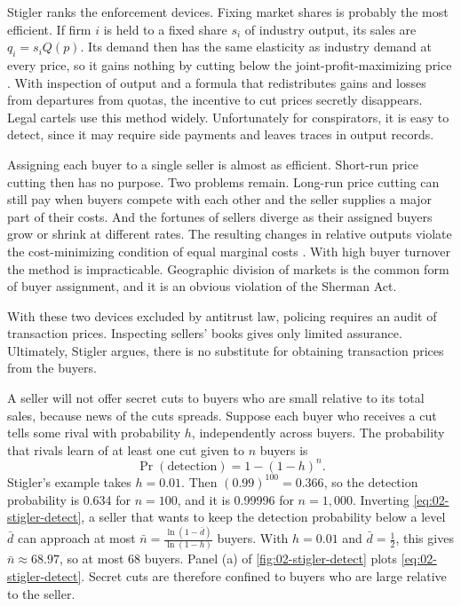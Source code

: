 Stigler ranks the enforcement devices. Fixing market shares is probably the most efficient. If firm $i$ is held to a
fixed share $s_i$ of industry output, its sales are $q_i = s_iQ(p)$. Its demand then has the same elasticity as
industry demand at every price, so it gains nothing by cutting below the joint-profit-maximizing price
\citep[footnote 4]{Stigler1964}. With inspection of output and a formula that redistributes gains and losses from
departures from quotas, the incentive to cut prices secretly disappears. Legal cartels use this method widely.
Unfortunately for conspirators, it is easy to detect, since it may require side payments and leaves traces in
output records.

Assigning each buyer to a single seller is almost as efficient. Short-run price cutting then has no purpose. Two
problems remain. Long-run price cutting can still pay when buyers compete with each other and the seller supplies a
major part of their costs. And the fortunes of sellers diverge as their assigned buyers grow or shrink at different
rates. The resulting changes in relative outputs violate the cost-minimizing condition of equal marginal costs
\citep[footnote 5]{Stigler1964}. With high buyer turnover the method is impracticable. Geographic division of
markets is the common form of buyer assignment, and it is an obvious violation of the Sherman Act.

With these two devices excluded by antitrust law, policing requires an audit of transaction prices. Inspecting
sellers' books gives only limited assurance. Ultimately, Stigler argues, there is no substitute for obtaining
transaction prices from the buyers.

A seller will not offer secret cuts to buyers who are small relative to its total sales, because news of the cuts
spreads. Suppose each buyer who receives a cut tells some rival with probability $h$, independently across buyers.
The probability that rivals learn of at least one cut given to $n$ buyers is
\begin{equation}\label{eq:02-stigler-detect}
\Pr(\text{detection}) = 1 - (1 - h)^n .
\end{equation}
Stigler's example takes $h = 0.01$. Then $(0.99)^{100} = 0.366$, so the detection probability is 0.634 for
$n = 100$, and it is 0.99996 for $n = 1{,}000$. Inverting \eqref{eq:02-stigler-detect}, a seller that wants to keep
the detection probability below a level $\bar d$ can approach at most
$\bar n = \frac{\ln(1 - \bar d)}{\ln(1 - h)}$ buyers. With $h = 0.01$ and $\bar d = \frac{1}{2}$, this gives
$\bar n \approx 68.97$, so at most 68 buyers. Panel (a) of \cref{fig:02-stigler-detect} plots \eqref{eq:02-stigler-detect}. Secret cuts are therefore
confined to buyers who are large relative to the seller.

